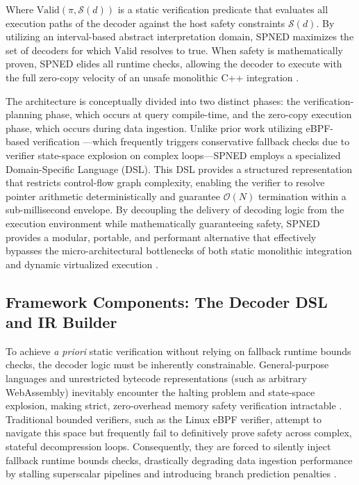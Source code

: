 \documentclass[onecolumn]{IEEEtran}
\numberwithin{equation}{section}
\theoremstyle{definition}
\theoremstyle{remark}
\begin{document}
Where $\text{Valid}(\pi, \mathcal{S}(d))$ is a static verification predicate that evaluates all execution paths of the decoder against the host safety constraints $\mathcal{S}(d)$. By utilizing an interval-based abstract interpretation domain, SPNED maximizes the set of decoders for which $\text{Valid}$ resolves to true. When safety is mathematically proven, SPNED elides all runtime checks, allowing the decoder to execute with the full zero-copy velocity of an unsafe monolithic C++ integration \cite{duckdb2025duckdb}.

The architecture is conceptually divided into two distinct phases: the verification-planning phase, which occurs at query compile-time, and the zero-copy execution phase, which occurs during data ingestion. Unlike prior work utilizing eBPF-based verification \cite{hedam2023delilah, borkmann2023bpf}---which frequently triggers conservative fallback checks due to verifier state-space explosion on complex loops---SPNED employs a specialized Domain-Specific Language (DSL). This DSL provides a structured representation that restricts control-flow graph complexity, enabling the verifier to resolve pointer arithmetic deterministically and guarantee $\mathcal{O}(N)$ termination within a sub-millisecond envelope. By decoupling the delivery of decoding logic from the execution environment while mathematically guaranteeing safety, SPNED provides a modular, portable, and performant alternative that effectively bypasses the micro-architectural bottlenecks of both static monolithic integration \cite{haas2012builtin} and dynamic virtualized execution \cite{gienieczko2025anyblox}.

\subsection{Framework Components: The Decoder DSL and IR Builder}

To achieve \textit{a priori} static verification without relying on fallback runtime bounds checks, the decoder logic must be inherently constrainable. General-purpose languages and unrestricted bytecode representations (such as arbitrary WebAssembly) inevitably encounter the halting problem and state-space explosion, making strict, zero-overhead memory safety verification intractable \cite{watt2018mechanising}. Traditional bounded verifiers, such as the Linux eBPF verifier, attempt to navigate this space but frequently fail to definitively prove safety across complex, stateful decompression loops. Consequently, they are forced to silently inject fallback runtime bounds checks, drastically degrading data ingestion performance by stalling superscalar pipelines and introducing branch prediction penalties \cite{hedam2023delilah, borkmann2023bpf}. 
\end{document}
